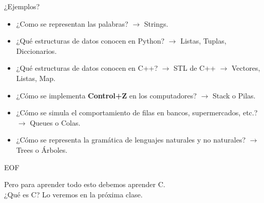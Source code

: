 \documentclass{beamer}
\begin{document}
\begin{frame}{¿Ejemplos?}
\begin{itemize}
\item ¿Como se representan las palabras? \pause $\rightarrow$ \pause Strings. \pause
\item ¿Qué estructuras de datos conocen en Python? \pause $\rightarrow$ \pause Listas, Tuplas, Diccionarios. \pause
\item ¿Qué estructuras de datos conocen en C++? \pause $\rightarrow$ \pause STL de C++ \pause $\rightarrow$ \pause Vectores, Listas, Map.\pause
\item ¿Cómo se implementa \textbf{Control+Z} en los computadores? \pause $\rightarrow$ \pause Stack o Pilas.\pause
\item ¿Cómo se simula el comportamiento de filas en bancos, supermercados, etc.? \pause $\rightarrow$ \pause Queues o Colas.\pause
\item ¿Cómo se representa la gramática de lenguajes naturales y no naturales? \pause $\rightarrow$ \pause Trees o Árboles. 
\end{itemize}
\end{frame}

\begin{frame}{EOF}

Pero para aprender todo esto debemos aprender C.\\[1em]

¿Qué es C? Lo veremos en la próxima clase. 

\end{frame}
\end{document}
